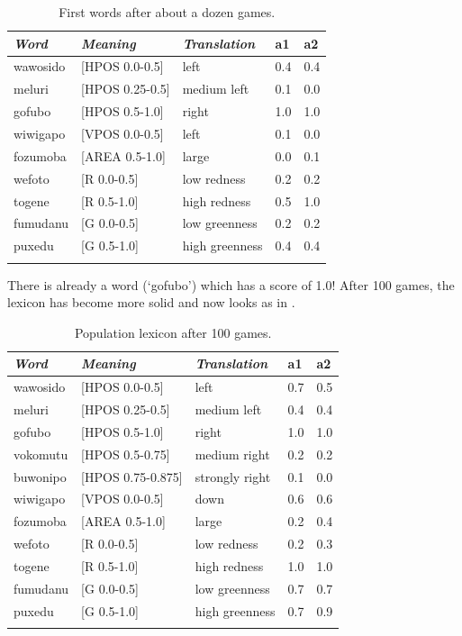 \begin{table}
\begin{center}
\begin{tabular}{ l  l  l  l  l }
\lsptoprule
{\itshape Word}&{\itshape Meaning}&{\itshape Translation} & {\bfshape a1}&{\bfshape a2} \\ \midrule
wawosido & [HPOS 0.0-0.5] &left&0.4&0.4\\ 
meluri & [HPOS 0.25-0.5] &medium left&0.1&0.0\\ 
gofubo & [HPOS 0.5-1.0]& right&1.0&1.0\\ 
wiwigapo & [VPOS 0.0-0.5] &left&0.1&0.0\\ 
fozumoba & [AREA 0.5-1.0]&large & 0.0&0.1\\ 
wefoto & [R 0.0-0.5]& low redness &0.2&0.2\\ 
togene & [R 0.5-1.0]& high redness &0.5&1.0\\ 
fumudanu & [G 0.0-0.5]& low greenness &0.2&0.2\\ 
puxedu & [G 0.5-1.0]& high greenness &0.4&0.4\\ 
\lspbottomrule
\end{tabular}
\caption{\label{tab:game50} First words after about a dozen games.}
\end{center}
\end{table}

There is already a word (`gofubo') which has
a score of 1.0! After 100 games, the lexicon has become more 
solid and now looks as in .    


\begin{table}
\begin{center}
\begin{tabular}{ l  l  l  l  l }
\lsptoprule
{\itshape Word}&{\itshape Meaning}&{\itshape Translation} & {\bfshape a1}&{\bfshape a2} \\ \midrule
wawosido & [HPOS 0.0-0.5] &left&0.7&0.5\\ 
meluri & [HPOS 0.25-0.5] &medium left&0.4&0.4\\ 
gofubo & [HPOS 0.5-1.0]& right&1.0&1.0\\ 
vokomutu & [HPOS 0.5-0.75] &medium right&0.2&0.2\\ 
buwonipo & [HPOS 0.75-0.875] &strongly right&0.1&0.0\\ 
wiwigapo & [VPOS 0.0-0.5] &down&0.6&0.6\\ 
fozumoba & [AREA 0.5-1.0]&large & 0.2&0.4\\ 
wefoto & [R 0.0-0.5]& low redness &0.2&0.3\\ 
togene & [R 0.5-1.0]& high redness &1.0&1.0\\ 
fumudanu & [G 0.0-0.5]& low greenness &0.7&0.7\\ 
puxedu & [G 0.5-1.0]& high greenness &0.7&0.9\\ 
\lspbottomrule
\end{tabular}
\caption{\label{tab:goubo} Population lexicon after 100 games.}
\end{center}
\end{table}


